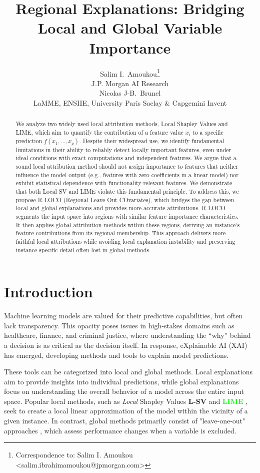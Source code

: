 \documentclass{article}
\title{Regional Explanations: Bridging Local and Global Variable Importance}
\author{%
  Salim I.~Amoukou\thanks{Correspondence to: Salim I. Amoukou
<salim.ibrahimamoukou@jpmorgan.com>}\\
  J.P. Morgan AI Research \\
 \And
   Nicolas J-B.~Brunel \\
   LaMME, ENSIIE, University Paris Saclay \& Capgemini Invent 
}
\theoremstyle{plain}
\theoremstyle{definition}
\theoremstyle{remark}
\newcommand{\lsv}{\textcolor{lsv}{\textbf{L-SV}}}
\newcommand{\lime}{\textcolor{lime}{\textbf{LIME}}}
\begin{document}
\maketitle


\begin{abstract}
We analyze two widely used local attribution methods, Local Shapley Values and LIME, which aim to quantify the contribution of a feature value $x_i$ to a specific prediction $f(x_1, \dots, x_p)$.  Despite their widespread use, we identify fundamental limitations in their ability to reliably detect locally important features, even under ideal conditions with exact computations and independent features. We argue that a sound local attribution method should not assign importance to features that neither influence the model output (e.g., features with zero coefficients in a linear model) nor exhibit statistical dependence with functionality-relevant features. We demonstrate that both Local SV and LIME violate this fundamental principle. To address this, we propose R-LOCO (Regional Leave Out COvariates), which bridges the gap between local and global explanations and provides more accurate attributions. R-LOCO segments the input space into regions with similar feature importance characteristics. It then applies global attribution methods within these regions, deriving an instance's feature contributions from its regional membership. This approach delivers more faithful local attributions while avoiding local explanation instability and preserving instance-specific detail often lost in global methods.
\end{abstract}


\section{Introduction}

Machine learning models are valued for their predictive capabilities, but often lack transparency. This opacity poses issues in high-stakes domains such as healthcare, finance, and criminal justice, where understanding the “why” behind a decision is as critical as the decision itself. In response, eXplainable AI (XAI) has emerged, developing methods and tools to explain model predictions.


These tools can be categorized into local and global methods. Local explanations aim to provide insights into individual predictions, while global explanations focus on understanding the overall behavior of a model across the entire input space. Popular local methods, such as \textit{Local} Shapley Values \lsv{} \citep{lundbergshap} and \lime{} \citep{ribeiro2016why}, seek to create a local linear approximation of the model within the vicinity of a given instance. In contrast, global methods primarily consist of "leave-one-out" approaches \citep{Lei2016DistributionFreePI,  williamson2020efficient, sage, gan2022inference}, which assess performance changes when a variable is excluded.
\end{document}
